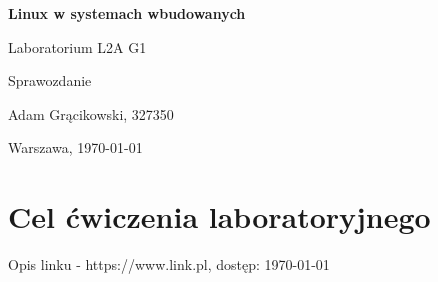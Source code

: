 \documentclass{article}
\begin{document}
\begin{titlepage}
    \centering
    \vfill    
    {\fontsize{40}{20}\selectfont \textbf{Linux w systemach wbudowanych} \par}
    \vspace{2cm}
    {\fontsize{30}{20}\selectfont Laboratorium L2A G1\par}
    \vspace{2cm}
    {\fontsize{20}{20}\selectfont Sprawozdanie\par}
    \vfill
    {\fontsize{10}{20}\selectfont Adam Grącikowski, 327350\par}
    \vspace{1cm}
    Warszawa, \today
\end{titlepage}



\tableofcontents
\newpage
\section{Cel ćwiczenia laboratoryjnego}



\begin{thebibliography}{9}
Opis linku - https://www.link.pl, dostęp: \today
\end{thebibliography}
\end{document}
